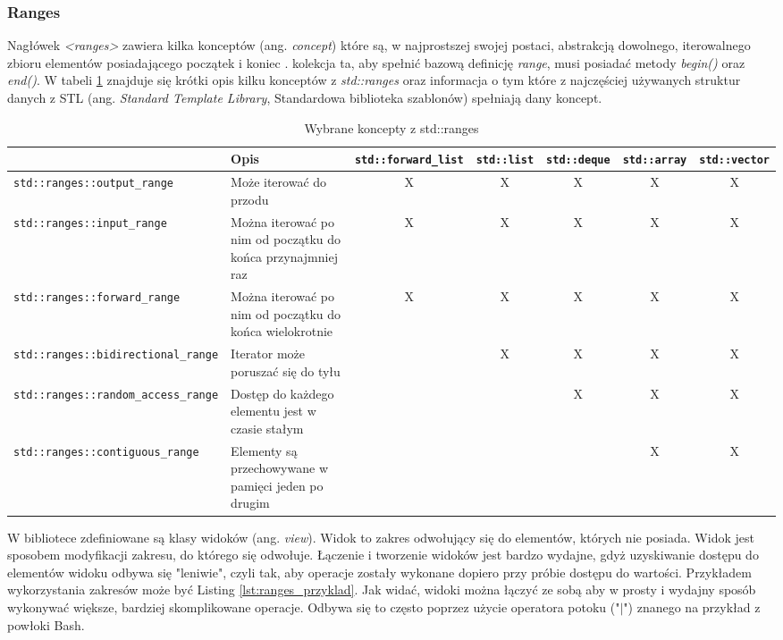 \documentclass[a4paper,12pt]{book} %
\begin{document}
\subsubsection{Ranges}
Nagłówek \emph{<ranges>} zawiera kilka konceptów (ang. \emph{concept}) które są, w najprostszej swojej postaci, abstrakcją dowolnego, iterowalnego zbioru elementów posiadającego początek i koniec \cite{ranges}. kolekcja ta, aby spełnić bazową definicję \emph{range}, musi posiadać metody \emph{begin()} oraz \emph{end()}. W tabeli \ref{ranges_concepts} znajduje się krótki opis kilku konceptów z \emph{std::ranges} oraz informacja o tym które z najczęściej używanych struktur danych z STL (ang. \emph{Standard Template Library}, Standardowa biblioteka szablonów) spełniają dany koncept.
\begin{table}[H]
\begin{adjustbox}{max width=\textwidth}
\begin{tabular}{|l|m{7cm}|ccccc|}
\hline
	& Opis & \texttt{std::forward\_list} & \texttt{std::list} & \texttt{std::deque} & \texttt{std::array} & \texttt{std::vector} \\
\hline
\texttt{std::ranges::output\_range} & Może iterować do przodu & X & X & X & X & X \\
\hline
\texttt{std::ranges::input\_range} & Można iterować po nim od początku do końca przynajmniej raz & X & X & X & X & X \\
\hline
\texttt{std::ranges::forward\_range} & Można iterować po nim od początku do końca wielokrotnie & X & X & X & X & X \\
\hline
\texttt{std::ranges::bidirectional\_range} & Iterator może poruszać się do tyłu & & X & X & X & X \\
\hline
\texttt{std::ranges::random\_access\_range} & Dostęp do każdego elementu jest w czasie stałym & & & X & X & X \\
\hline
\texttt{std::ranges::contiguous\_range} & Elementy są przechowywane w pamięci jeden po drugim & & & & X & X \\
\hline
\end{tabular}
\end{adjustbox}
\caption{Wybrane koncepty z std::ranges}
\label{ranges_concepts}
\end{table}
W bibliotece zdefiniowane są klasy widoków (ang. \emph{view}). Widok to zakres odwołujący się do elementów, których nie posiada. Widok jest sposobem modyfikacji zakresu, do którego się odwołuje. Łączenie i tworzenie widoków jest bardzo wydajne, gdyż uzyskiwanie dostępu do elementów widoku odbywa się "leniwie", czyli tak, aby operacje zostały wykonane dopiero przy próbie dostępu do wartości. Przykładem wykorzystania zakresów może być Listing \ref{lst:ranges_przyklad}. Jak widać, widoki można łączyć ze sobą aby w prosty i wydajny sposób wykonywać większe, bardziej skomplikowane operacje. Odbywa się to często poprzez użycie operatora potoku ("$|$") znanego na przykład z powłoki Bash.
\end{document}
